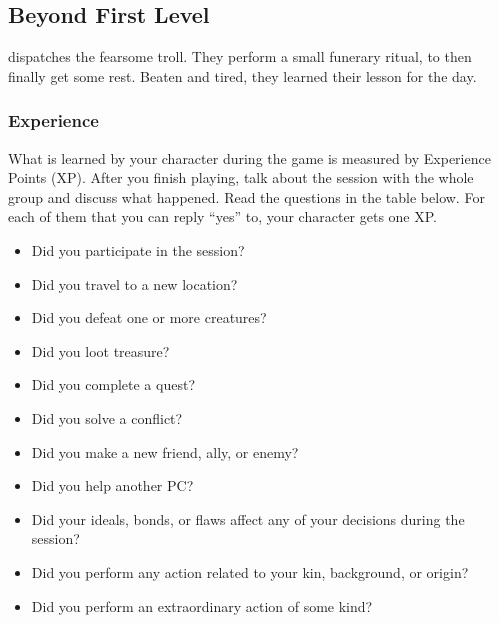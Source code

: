 \subsection*{Beyond First Level} \label{ssec::beyondfirstlevel}
dispatches the fearsome troll.
They perform a small funerary ritual, to then finally get some rest.
Beaten and tired, they learned their lesson for the day.

\thispagestyle{empty}

\subsubsection{Experience}
    What is learned by your character during the game is measured by Experience Points (XP).
    After you finish playing, talk about the session with the whole group and discuss what happened.
    Read the questions in the table below.
    For each of them that you can reply ``yes'' to, your character gets one XP.

    \begin{itemize}
        \item Did you participate in the session?
        \item Did you travel to a new location?
        \item Did you defeat one or more creatures?
        \item Did you loot treasure?
        \item Did you complete a quest?
        \item Did you solve a conflict?
        \item Did you make a new friend, ally, or enemy?
        \item Did you help another PC?
        \item Did your ideals, bonds, or flaws affect any of your decisions during the session?
        \item Did you perform any action related to your kin, background, or origin?
        \item Did you perform an extraordinary action of some kind?
    \end{itemize}

